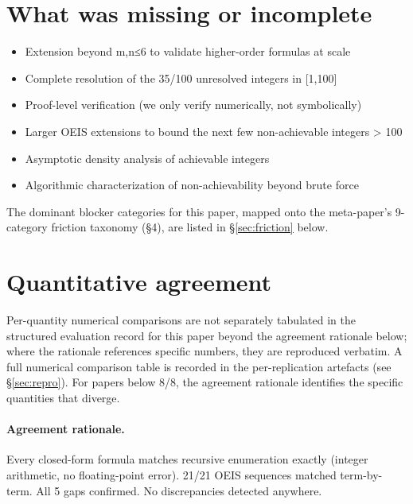\documentclass[11pt]{article}
\begin{document}
\section{What was missing or incomplete}
\begin{itemize}
\item Extension beyond m,n≤6 to validate higher-order formulas at scale
\item Complete resolution of the 35/100 unresolved integers in [1,100]
\item Proof-level verification (we only verify numerically, not symbolically)
\item Larger OEIS extensions to bound the next few non-achievable integers \textgreater{} 100
\item Asymptotic density analysis of achievable integers
\item Algorithmic characterization of non-achievability beyond brute force
\end{itemize}
The dominant blocker categories for this paper, mapped onto the meta-paper's 9-category friction taxonomy (\S4), are listed in \S\ref{sec:friction} below.

\section{Quantitative agreement}
Per-quantity numerical comparisons are not separately tabulated in the structured evaluation record for this paper beyond the agreement rationale below; where the rationale references specific numbers, they are reproduced verbatim. A full numerical comparison table is recorded in the per-replication artefacts (see \S\ref{sec:repro}). For papers below 8/8, the agreement rationale identifies the specific quantities that diverge.

\paragraph{Agreement rationale.} Every closed-form formula matches recursive enumeration exactly (integer arithmetic, no floating-point error). 21/21 OEIS sequences matched term-by-term. All 5 gaps confirmed. No discrepancies detected anywhere.
\end{document}
